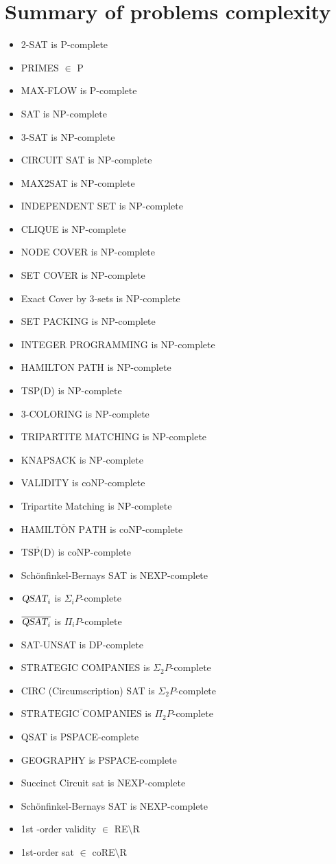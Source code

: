 \section{Summary of problems complexity}
\begin{itemize}
    \item 2-SAT is P-complete
    \item PRIMES $\in$ P
    \item MAX-FLOW is P-complete
    \item SAT is NP-complete
    \item 3-SAT is NP-complete
    \item CIRCUIT SAT is NP-complete
    \item MAX2SAT is NP-complete
    \item INDEPENDENT SET is NP-complete
    \item CLIQUE is NP-complete
    \item NODE COVER is NP-complete
    \item SET COVER is NP-complete
    \item Exact Cover by 3-sets is NP-complete
    \item SET PACKING is NP-complete
    \item INTEGER PROGRAMMING is NP-complete
    \item HAMILTON PATH is NP-complete
    \item TSP(D) is NP-complete
    \item 3-COLORING is NP-complete
    \item TRIPARTITE MATCHING is NP-complete
    \item KNAPSACK is NP-complete
    \item VALIDITY is coNP-complete
    \item Tripartite Matching is NP-complete
    \item $\overline{\text{HAMILTON PATH}}$ is coNP-complete
    \item $\overline{\text{TSP(D)}}$ is coNP-complete
    \item Schönfinkel-Bernays SAT is NEXP-complete
    \item $\textsl{QSAT}_i$ is $\Sigma_iP$-complete
    \item $\overline{\textsl{QSAT}_i}$ is $\Pi_iP$-complete
    \item SAT-UNSAT is DP-complete
    \item STRATEGIC COMPANIES is $\Sigma_2P$-complete
    \item CIRC (Circumscription) SAT is $\Sigma_2P$-complete
    \item $\overline{\text{STRATEGIC COMPANIES}}$ is $\Pi_2P$-complete
    \item QSAT is PSPACE-complete
    \item GEOGRAPHY is PSPACE-complete
    \item Succinct Circuit sat is NEXP-complete
    \item Schönfinkel-Bernays SAT is NEXP-complete
    \item 1st -order validity $\in$ RE$\setminus$R
    \item 1st-order sat $\in$ coRE$\setminus$R
\end{itemize}